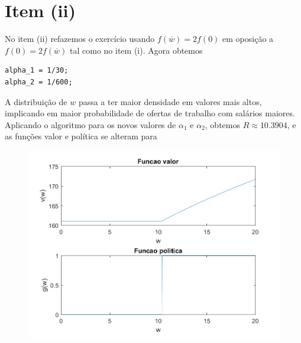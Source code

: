 \documentclass{article}
\begin{document}
\section*{Item (ii)}

No item (ii) refazemos o exercício usando $f(\overline{w}) = 2f(0)$ em oposição a $f(0) = 2f(\overline{w})$ tal como no item (i).
Agora obtemos 

\begin{lstlisting}
alpha_1 = 1/30;
alpha_2 = 1/600;
\end{lstlisting}

A distribuição de $w$ passa a ter maior densidade em valores mais altos,
implicando em maior probabilidade de ofertas de trabalho com salários maiores.
Aplicando o algoritmo para os novos valores de  $\alpha_1$ e $\alpha_2$, 
obtemos $R \approx 10.3904$, e as funções valor e política se alteram para

\begin{figure}[!h]
  \includegraphics{ex1_2.png}
\end{figure}
\end{document}
